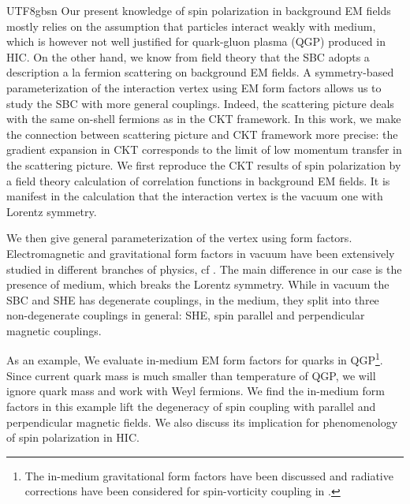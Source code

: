 \documentclass[11pt]{article}\def\baselinestretch{1.4}
\begin{document}
\begin{CJK}{UTF8}{gbsn}
Our present knowledge of spin polarization in background EM fields mostly relies on the assumption that particles interact weakly with medium, which is however not well justified for quark-gluon plasma (QGP) produced in HIC. On the other hand, we know from field theory that the SBC adopts a description a la fermion scattering on background EM fields. A symmetry-based parameterization of the interaction vertex using EM form factors allows us to study the SBC with more general couplings. Indeed, the scattering picture deals with the same on-shell fermions as in the CKT framework. In this work, we make the connection between scattering picture and CKT framework more precise: the gradient expansion in CKT corresponds to the limit of low momentum transfer in the scattering picture. We first reproduce the CKT results of spin polarization by a field theory calculation of correlation functions in background EM fields. It is manifest in the calculation that the interaction vertex is the vacuum one with Lorentz symmetry.



We then give general parameterization of the vertex using form factors.
Electromagnetic and gravitational form factors in vacuum have been extensively studied in different branches of physics, cf \cite{Giunti:2014ixa,Polyakov:2018zvc}. The main difference in our case is the presence of medium, which breaks the Lorentz symmetry. While in vacuum the SBC and SHE has degenerate couplings, in the medium, they split into three non-degenerate couplings in general: SHE, spin parallel and perpendicular magnetic couplings.

As an example, We evaluate in-medium EM form factors for quarks in QGP\footnote{The in-medium gravitational form factors have been discussed and radiative corrections have been considered for spin-vorticity coupling in \cite{Buzzegoli:2021jeh,Lin:2023ass}.}. Since current quark mass is much smaller than temperature of QGP, we will ignore quark mass and work with Weyl fermions. We find the in-medium form factors in this example lift the degeneracy of spin coupling with parallel and perpendicular magnetic fields. We also discuss its implication for phenomenology of spin polarization in HIC.


\end{CJK}
\end{document}
